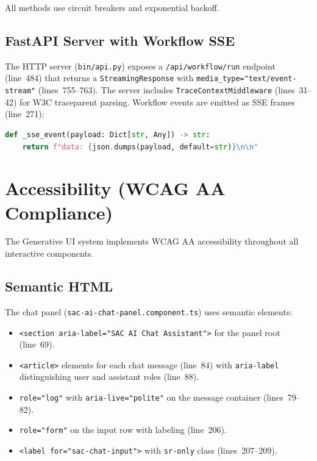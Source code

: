 \documentclass[11pt]{article}
\begin{document}
\noindent All methods use circuit breakers and exponential backoff.

\subsection{FastAPI Server with Workflow SSE}

The HTTP server (\texttt{bin/api.py}) exposes a \texttt{/api/workflow/run}
endpoint (line~484) that returns a \texttt{StreamingResponse} with
\texttt{media\_type="text/event-stream"} (lines~755--763). The server includes
\texttt{TraceContextMiddleware} (lines~31--42) for W3C traceparent parsing.
Workflow events are emitted as SSE frames (line~271):

\begin{lstlisting}[language=Python,caption={SSE event emission (bin/api.py:270--271)}]
def _sse_event(payload: Dict[str, Any]) -> str:
    return f"data: {json.dumps(payload, default=str)}\n\n"
\end{lstlisting}

\section{Accessibility (WCAG AA Compliance)}
\label{sec:a11y}

The Generative UI system implements WCAG AA accessibility throughout all
interactive components.

\subsection{Semantic HTML}

The chat panel
(\texttt{sac-ai-chat-panel.component.ts}) uses semantic elements:

\begin{itemize}
  \item \texttt{<section aria-label="SAC AI Chat Assistant">} for the panel
    root (line~69).
  \item \texttt{<article>} elements for each chat message (line~84) with
    \texttt{aria-label} distinguishing user and assistant roles (line~88).
  \item \texttt{role="log"} with \texttt{aria-live="polite"} on the message
    container (lines~79--82).
  \item \texttt{role="form"} on the input row with labeling (line~206).
  \item \texttt{<label for="sac-chat-input">} with \texttt{sr-only} class
    (lines~207--209).
\end{itemize}
\end{document}
